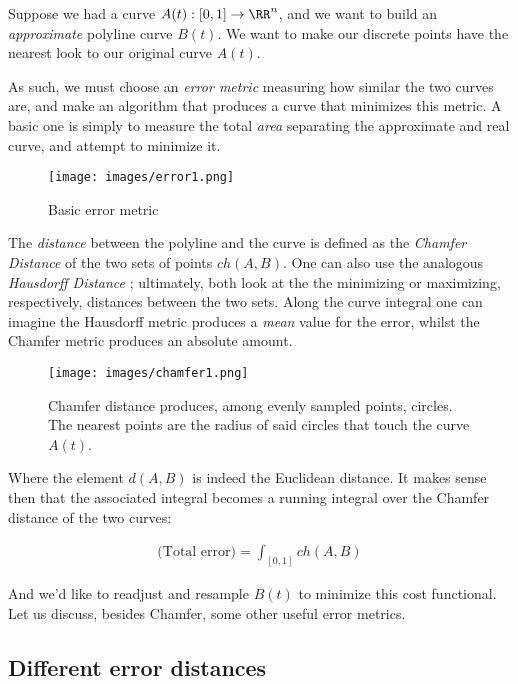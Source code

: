 Suppose we had a curve $A(t):[0,1] \rightarrow \RR^n$,
and we want to build an \emph{approximate} polyline curve
$B(t)$. We want to make our discrete points have the nearest
look to our original curve $A(t)$. 

\spa

As such, we must choose an \emph{error metric} measuring how
similar the two curves are, and make an algorithm that produces a
curve that minimizes this metric. A basic one is simply to measure
the total \emph{area} separating the approximate and real curve,
and attempt to minimize it.

\begin{figure}[h]
    \centering
    \texttt{[image: images/error1.png]}
    \caption{Basic error metric}
\end{figure}

\spa

The \emph{distance} between the polyline and the curve is
defined as the \emph{Chamfer Distance} \cite{chamfer1}
of the two sets of points $ch(A,B)$. One can also use the analogous
\emph{Hausdorff Distance} \cite{chamfer3}; ultimately, both
look at the the minimizing or maximizing, respectively, distances between
the two sets. Along the curve integral one can imagine the Hausdorff
metric produces a \emph{mean} value for the error, whilst the Chamfer
metric produces an absolute amount.

\begin{figure}[h]
    \centering
    \texttt{[image: images/chamfer1.png]}
    \caption{Chamfer distance produces,
    among evenly sampled points, circles.
    The nearest points are the radius of
    said circles that touch the curve $A(t)$.}
\end{figure}

Where the element $d(A,B)$ is indeed the Euclidean distance.
It makes sense then that the associated integral
becomes a running integral over the Chamfer distance
of the two curves:

\begin{align*}
    \text{(Total error)} = \int_{[0,1]} ch(A,B) 
\end{align*}

And we'd like to readjust and resample $B(t)$ to
minimize this cost functional. Let us discuss, besides Chamfer, some 
other useful error metrics.

\subsection{Different error distances}


